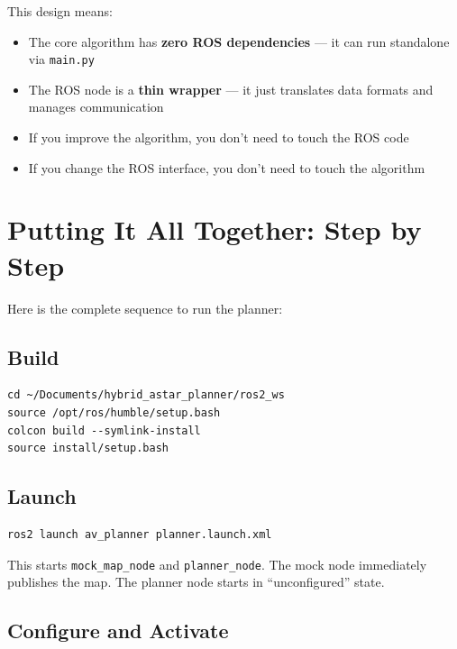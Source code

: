 \documentclass[12pt, a4paper]{article}
\begin{document}
This design means:
\begin{itemize}[nosep]
    \item The core algorithm has \textbf{zero ROS dependencies} --- it can
          run standalone via \texttt{main.py}
    \item The ROS node is a \textbf{thin wrapper} --- it just translates
          data formats and manages communication
    \item If you improve the algorithm, you don't need to touch the ROS code
    \item If you change the ROS interface, you don't need to touch the algorithm
\end{itemize}


\section{Putting It All Together: Step by Step}
\label{sec:tutorial}

Here is the complete sequence to run the planner:

\subsection{Build}

\begin{lstlisting}[style=bash]
cd ~/Documents/hybrid_astar_planner/ros2_ws
source /opt/ros/humble/setup.bash
colcon build --symlink-install
source install/setup.bash
\end{lstlisting}

\subsection{Launch}

\begin{lstlisting}[style=bash]
ros2 launch av_planner planner.launch.xml
\end{lstlisting}

This starts \texttt{mock\_map\_node} and \texttt{planner\_node}.
The mock node immediately publishes the map. The planner node starts
in ``unconfigured'' state.

\subsection{Configure and Activate}
\end{document}
